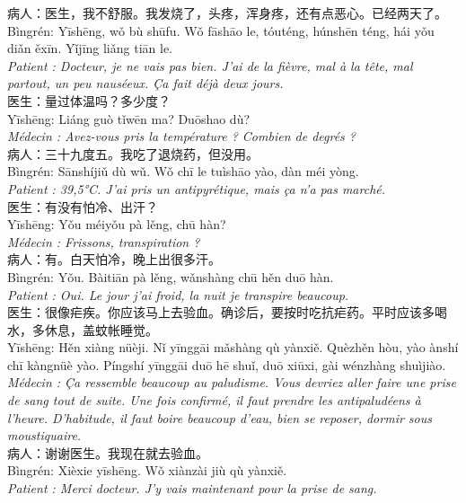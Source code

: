 \documentclass[11pt]{article}
\begin{document}
\begin{textebox}
病人：医生，我不舒服。我发烧了，头疼，浑身疼，还有点恶心。已经两天了。\\
Bìngrén: Yīshēng, wǒ bù shūfu. Wǒ fāshāo le, tóuténg, húnshēn téng, hái yǒu diǎn ěxīn. Yǐjīng liǎng tiān le.\\
\textit{Patient : Docteur, je ne vais pas bien. J'ai de la fièvre, mal à la tête, mal partout, un peu nauséeux. Ça fait déjà deux jours.}\\
医生：量过体温吗？多少度？\\
Yīshēng: Liáng guò tǐwēn ma? Duōshao dù?\\
\textit{Médecin : Avez-vous pris la température ? Combien de degrés ?}\\
病人：三十九度五。我吃了退烧药，但没用。\\
Bìngrén: Sānshíjiǔ dù wǔ. Wǒ chī le tuìshāo yào, dàn méi yòng.\\
\textit{Patient : 39,5°C. J'ai pris un antipyrétique, mais ça n'a pas marché.}\\
医生：有没有怕冷、出汗？\\
Yīshēng: Yǒu méiyǒu pà lěng, chū hàn?\\
\textit{Médecin : Frissons, transpiration ?}\\
病人：有。白天怕冷，晚上出很多汗。\\
Bìngrén: Yǒu. Bàitiān pà lěng, wǎnshàng chū hěn duō hàn.\\
\textit{Patient : Oui. Le jour j'ai froid, la nuit je transpire beaucoup.}\\
医生：很像疟疾。你应该马上去验血。确诊后，要按时吃抗疟药。平时应该多喝水，多休息，盖蚊帐睡觉。\\
Yīshēng: Hěn xiàng nüèji. Nǐ yīnggāi mǎshàng qù yànxiě. Quèzhěn hòu, yào ànshí chī kàngnüè yào. Píngshí yīnggāi duō hē shuǐ, duō xiūxi, gài wénzhàng shuìjiào.\\
\textit{Médecin : Ça ressemble beaucoup au paludisme. Vous devriez aller faire une prise de sang tout de suite. Une fois confirmé, il faut prendre les antipaludéens à l'heure. D'habitude, il faut boire beaucoup d'eau, bien se reposer, dormir sous moustiquaire.}\\
病人：谢谢医生。我现在就去验血。\\
Bìngrén: Xièxie yīshēng. Wǒ xiànzài jiù qù yànxiě.\\
\textit{Patient : Merci docteur. J'y vais maintenant pour la prise de sang.}
\end{textebox}
\end{document}
